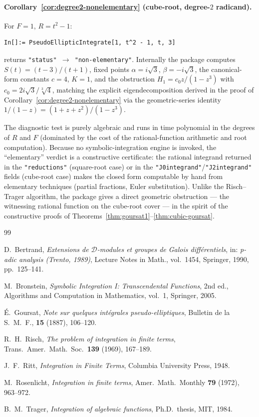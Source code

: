 \documentclass[11pt,a4paper]{article}
\theoremstyle{plain}
\theoremstyle{definition}
\theoremstyle{remark}
\begin{document}
\paragraph{Corollary~\ref{cor:degree2-nonelementary} (cube-root, degree-$2$ radicand).} For $F=1$, $R=t^2-1$:
\begin{lstlisting}[basicstyle=\footnotesize\ttfamily,frame=none]
In[]:= PseudoEllipticIntegrate[1, t^2 - 1, t, 3]
\end{lstlisting}
returns \texttt{"status"\,$\to$\,"non-elementary"}. Internally the package computes $S(t)=(t-3)/(t+1)$, fixed points $\alpha=i\sqrt{3}$, $\beta=-i\sqrt{3}$, the canonical-form constants $c=4$, $K=1$, and the obstruction $H_1 = c_0 z/(1-z^3)$ with $c_0 = 2i\sqrt{3}/\sqrt[3]{4}$, matching the explicit eigendecomposition derived in the proof of Corollary~\ref{cor:degree2-nonelementary} via the geometric-series identity $1/(1-z) = (1+z+z^2)/(1-z^3)$.

\medskip
\noindent
The diagnostic test is purely algebraic and runs in time polynomial in the degrees of $R$ and $F$ (dominated by the cost of the rational-function arithmetic and root computation). Because no symbolic-integration engine is invoked, the ``elementary'' verdict is a constructive certificate: the rational integrand returned in the \texttt{"reductions"} (square-root case) or in the \texttt{"J0integrand"}/\texttt{"J2integrand"} fields (cube-root case) makes the closed form computable by hand from elementary techniques (partial fractions, Euler substitution). Unlike the Risch--Trager algorithm, the package gives a direct geometric obstruction --- the witnessing rational function on the cube-root cover --- in the spirit of the constructive proofs of Theorems~\ref{thm:goursat1}--\ref{thm:cubic-goursat}.


\begin{thebibliography}{99}

D.~Bertrand,
\emph{Extensions de $\mathcal{D}$-modules et groupes de Galois diff\'erentiels},
in: \emph{p-adic analysis (Trento, 1989)}, Lecture Notes in Math., vol.~1454, Springer, 1990, pp.~125--141.

M.~Bronstein,
\emph{Symbolic Integration I: Transcendental Functions},
2nd ed., Algorithms and Computation in Mathematics, vol.~1, Springer, 2005.

\'E.~Goursat,
\emph{Note sur quelques int\'egrales pseudo-elliptiques},
Bulletin de la S.~M.~F., \textbf{15} (1887), 106--120.

R.~H.~Risch,
\emph{The problem of integration in finite terms},
Trans.\ Amer.\ Math.\ Soc.\ \textbf{139} (1969), 167--189.

J.~F.~Ritt,
\emph{Integration in Finite Terms},
Columbia University Press, 1948.

M.~Rosenlicht,
\emph{Integration in finite terms},
Amer.\ Math.\ Monthly \textbf{79} (1972), 963--972.

B.~M.~Trager,
\emph{Integration of algebraic functions},
Ph.D.\ thesis, MIT, 1984.

\end{thebibliography}
\end{document}
